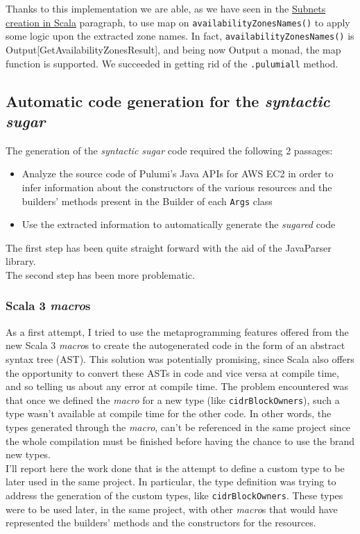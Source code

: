 Thanks to this implementation we are able, as we have seen in the \hyperref[sssec:subnets-creation]{Subnets creation in Scala} paragraph, to use map on \texttt{availabilityZonesNames()} to apply some logic upon the extracted zone names.
In fact, \texttt{availabilityZonesNames()} is Output[GetAvailabilityZonesResult], and being now Output a monad, the map function is supported.
We succeeded in getting rid of the \texttt{.pulumiall} method.

\subsection{Automatic code generation for the \textit{syntactic sugar}}
The generation of the \textit{syntactic sugar} code required the following 2 passages:
\begin{itemize}
  \item Analyze the source code of Pulumi's Java APIs for AWS EC2 in order to infer information about the constructors of the various resources and the builders' methods present in the Builder of each \texttt{Args} class
  \item Use the extracted information to automatically generate the \textit{sugared} code
\end{itemize}
The first step has been quite straight forward with the aid of the JavaParser library.\\
The second step has been more problematic.

\subsubsection{Scala 3 \textit{macro}s}
As a first attempt, I tried to use the metaprogramming features offered from the new Scala 3 \textit{macro}s to create the autogenerated code in the form of an \gls{abstract syntax tree} (AST).
This solution was potentially promising, since Scala also offers the opportunity to convert these ASTs in code and vice versa at compile time, and so telling us about any error at compile time.
The problem encountered was that once we defined the \textit{macro} for a new type (like \texttt{cidrBlockOwners}), such a type wasn't available at compile time for the other code.
In other words, the types generated through the \textit{macro}, can't be referenced in the same project since the whole compilation must be finished before having the chance to use the brand new types.\\
I'll report here the work done that is the attempt to define a custom type to be later used in the same project.
In particular, the type definition was trying to address the generation of the custom types, like \texttt{cidrBlockOwners}. 
These types were to be used later, in the same project, with other \textit{macro}s that would have represented the builders' methods and the constructors for the resources.

